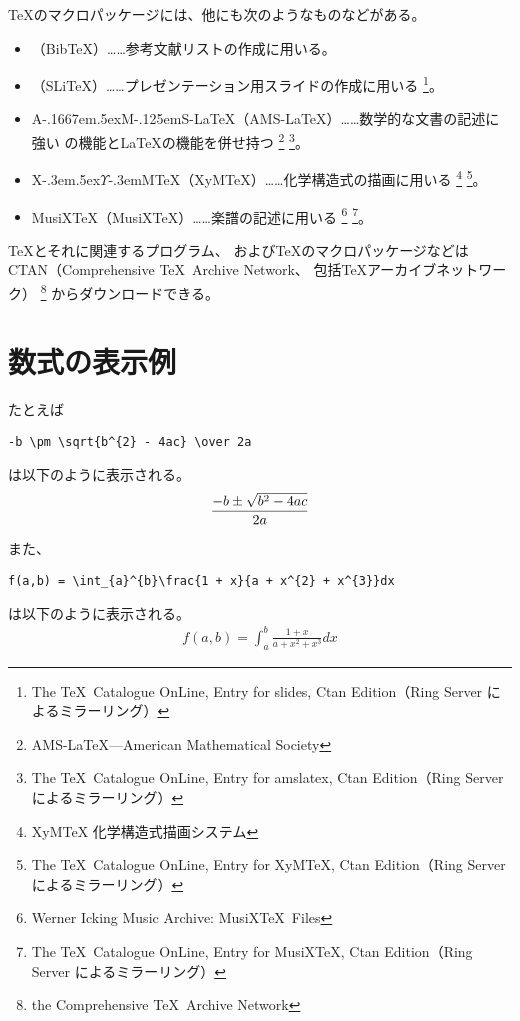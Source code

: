 \documentclass{jsarticle}
\def\AmS{{\usefont{OMS}{cmsy}{m}{n}%
    A\kern-.1667em\lower.5ex\hbox{M}\kern-.125emS}}}{}
\def\XyMTeX{X\kern-.3em\raise.5ex\hbox{$\Upsilon$}\kern-.3emM\protect\TeX}}{}
\begin{document}
\TeX のマクロパッケージには、他にも次のようなものなどがある。
\begin{itemize}
\item 
\BibTeX（BibTeX）\<……参考文献リストの作成に用いる。

\item 
\SliTeX（SLiTeX）\<……プレゼンテーション用スライドの作成に用いる%
\footnote{The \TeX\ Catalogue OnLine, Entry for slides, 
Ctan Edition（Ring Server によるミラーリング）}。

\item 
\AmS-\LaTeX（AMS-LaTeX）\<……数学的な文書の記述に強い
\AmSTeX の機能と\LaTeX の機能を併せ持つ%
\footnote{AMS-LaTeX---American Mathematical Society}%
\footnote{The \TeX\ Catalogue OnLine, Entry for amslatex, 
Ctan Edition（Ring Server によるミラーリング）}。

\item 
\XyMTeX（XyMTeX）\<……化学構造式の描画に用いる%
\footnote{XyMTeX 化学構造式描画システム}%
\footnote{The \TeX\ Catalogue OnLine, Entry for XyMTeX, 
Ctan Edition（Ring Server によるミラーリング）}。

\item 
MusiX\TeX（MusiXTeX）\<……楽譜の記述に用いる%
\footnote{Werner Icking Music Archive: MusiX\TeX\ Files}%
\footnote{The \TeX\ Catalogue OnLine, Entry for MusiXTeX, 
Ctan Edition（Ring Server によるミラーリング）}。
\end{itemize}
\TeX とそれに関連するプログラム、
および\TeX のマクロパッケージなどは
CTAN（Comprehensive \TeX\ Archive Network、
包括\TeX アーカイブネットワーク）%
\footnote{the Comprehensive \TeX\ Archive Network}%
からダウンロードできる。

\section{数式の表示例}

たとえば
\begin{verbatim}
-b \pm \sqrt{b^{2} - 4ac} \over 2a
\end{verbatim}
は以下のように表示される。
\begin{eqnarray*}
 -b \pm \sqrt{b^{2} - 4ac} \over 2a
\end{eqnarray*}

また、
\begin{verbatim}
f(a,b) = \int_{a}^{b}\frac{1 + x}{a + x^{2} + x^{3}}dx
\end{verbatim}
は以下のように表示される。
\begin{eqnarray*}
 f(a,b) = \int_{a}^{b}\frac{1 + x}{a + x^{2} + x^{3}}dx
\end{eqnarray*}
\end{document}
